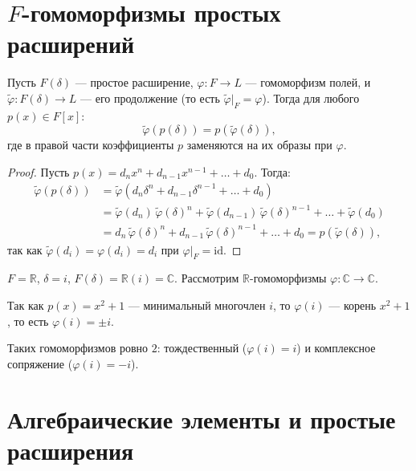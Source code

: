 \section{$F$-гомоморфизмы простых расширений}

\begin{stmt}
    Пусть $F(\delta)$ --- простое расширение, $\varphi\colon F \to L$ --- гомоморфизм полей, и $\tilde{\varphi}
    \colon F(\delta) \to L$ --- его продолжение (то есть $\tilde{\varphi}\big|_F = \varphi$). Тогда для любого
    $p(x) \in F[x]$:
    \[
        \tilde{\varphi}(p(\delta)) = p(\tilde{\varphi}(\delta)),
    \]
    где в правой части коэффициенты $p$ заменяются на их образы при $\varphi$.

    \begin{proof}
        Пусть $p(x) = d_n x^n + d_{n-1} x^{n-1} + \dots + d_0$. Тогда:
        \begin{align*}
            \tilde{\varphi}(p(\delta)) &= \tilde{\varphi}(d_n \delta^n + d_{n-1}\delta^{n-1} + \dots + d_0)
            \\
            &= \tilde{\varphi}(d_n)\,\tilde{\varphi}(\delta)^n + \tilde{\varphi}(d_{n-1})\,\tilde{\varphi}
            (\delta)^{n-1} + \dots + \tilde{\varphi}(d_0) \\
            &= d_n\,\tilde{\varphi}(\delta)^n + d_{n-1}\,\tilde{\varphi}(\delta)^{n-1} + \dots + d_0 = p(\tilde{\varphi}
            (\delta)),
        \end{align*}
        так как $\tilde{\varphi}(d_i) = \varphi(d_i) = d_i$ при $\varphi\big|_F = \mathrm{id}$.
    \end{proof}
\end{stmt}


\begin{example}
    $F = \mathbb{R}$, $\delta = i$, $F(\delta) = \mathbb{R}(i) = \mathbb{C}$. Рассмотрим $\mathbb{R}$-гомоморфизмы
    $\varphi\colon \mathbb{C} \to \mathbb{C}$.

    Так как $p(x) = x^2 + 1$ --- минимальный многочлен $i$, то $\varphi(i)$ --- корень $x^2 + 1$, то есть
    $\varphi(i) = \pm i$.

    Таких гомоморфизмов ровно $2$: тождественный ($\varphi(i) = i$) и комплексное сопряжение ($\varphi(i)
    = -i$).
\end{example}


\section{Алгебраические элементы и простые расширения}

